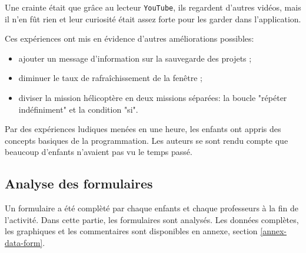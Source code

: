 Une crainte était que grâce au lecteur \texttt{YouTube}, ils regardent d'autres vidéos, mais il n'en fût rien et leur curiosité était assez forte pour les garder dans l'application.

Ces expériences ont mis en évidence d'autres améliorations possibles: 
\begin{itemize}
  \item ajouter un message d'information sur la sauvegarde des projets ;
  \item diminuer le taux de rafraîchissement de la fenêtre ;
  \item diviser la mission hélicoptère en deux missions séparées: la boucle "répéter indéfiniment" et la condition "si".
\end{itemize}

Par des expériences ludiques menées en une heure, les enfants ont appris des concepts basiques de la programmation. Les auteurs se sont rendu compte que beaucoup d'enfants n'avaient pas vu le temps passé.

\subsection{Analyse des formulaires}
\label{analyse-exp}
Un formulaire a été complèté par chaque enfants et chaque professeurs à la fin de l'activité. Dans cette partie, les formulaires sont analysés. Les données complètes, les graphiques et les commentaires sont disponibles en annexe, section \ref{annex-data-form}.

